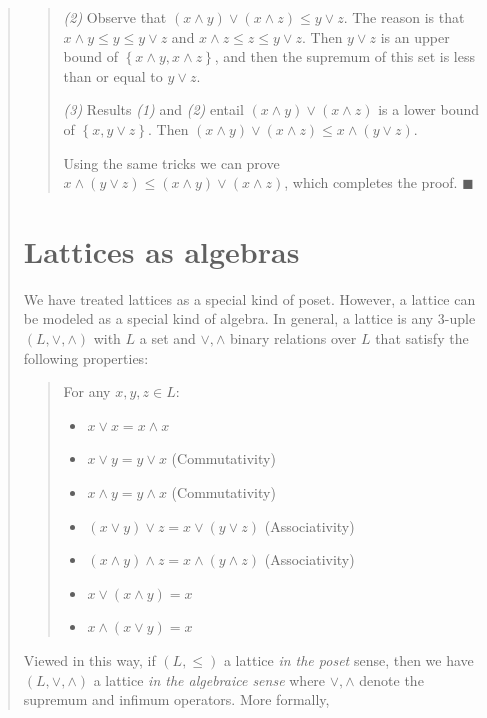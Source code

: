 \documentclass[a4paper, 12pt]{article}
\begin{document}
\begin{quote}
\begin{quote}
\textit{(2)} Observe that $(x \land  y) \lor  (x \land z) \leq y \lor  z$. The
reason is that $x \land  y \leq y \leq y \lor  z$ and $x \land  z \leq  
z \leq y \lor  z$. Then $y \lor  z$ is an upper bound of $\left\{ x \land  y, x
\land  z\right\} $, and then the supremum of this set is less than or equal to
$y \lor  z$.

\textit{(3)} Results \textit{(1)} and \textit{(2)} entail $(x \land  y) \lor (x
\land  z)$ is a lower bound of $\left\{ x, y \lor  z \right\} $. Then $(x \land
y) \lor  (x \land  z) \leq x \land  (y \lor  z)$.

Using the same tricks we can prove $x \land  (y \lor  z) \leq (x \land  y) \lor
(x \land  z)$, which completes the proof. $\blacksquare$

\end{quote}
\normalsize



\section{Lattices as algebras}

We have treated lattices as a special kind of poset. However, a lattice can be
modeled as a special kind of algebra. In general, a lattice is any $3$-uple $(L, \lor,
\land)$ with $L$ a set and $\lor, \land$ binary relations over $L$ that satisfy
the following properties: 


\small
\begin{quote}

    For any $x, y, z \in L$:

\begin{itemize}
    \item $x \lor x = x \land x$ 
    \item $x \lor y = y \lor x$ (Commutativity)
    \item $x \land y = y \land x$ (Commutativity)
    \item $(x \lor y) \lor z = x \lor (y \lor z)$ (Associativity)
    \item $(x \land y) \land z = x \land (y \land z)$ (Associativity)
    \item $x \lor (x \land y) = x $
    \item $x \land (x \lor y) = x$
\end{itemize}

\end{quote}
\normalsize

Viewed in this way, if $(L, \leq)$ a lattice \textit{in the poset} sense, then
we have $(L, \lor, \land)$ a lattice \textit{in the algebraice sense} where
$\lor, \land$ denote the supremum and infimum operators. More formally,


\end{quote}
\end{document}
